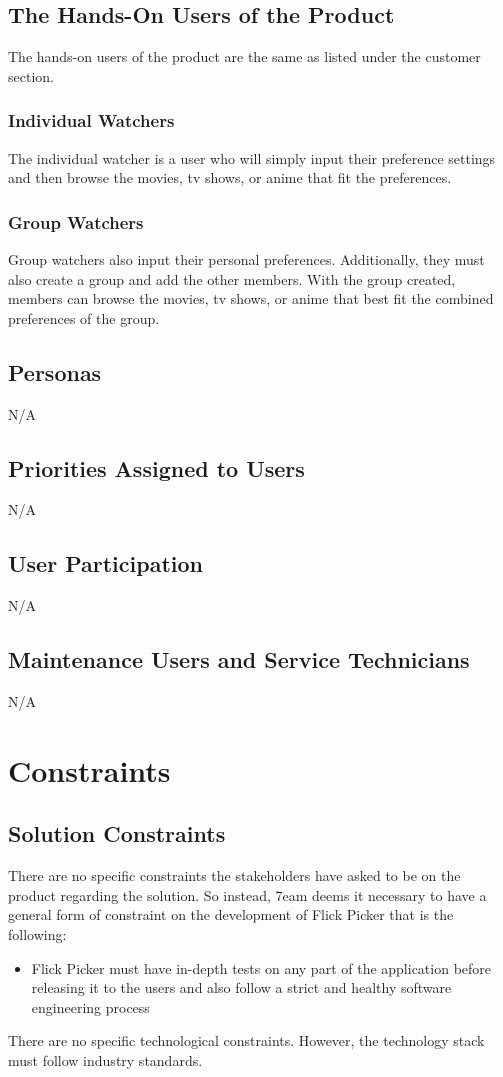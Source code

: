 \documentclass[12pt]{article}
\begin{document}
\subsection{The Hands-On Users of the Product}
The hands-on users of the product are the same as listed under the customer section.

\subsubsection*{Individual Watchers}
The individual watcher is a user who will simply input their preference settings and then browse the movies, tv shows, or anime that fit the preferences.
\subsubsection*{Group Watchers}
Group watchers also input their personal preferences.
Additionally, they must also create a group and add the other members.
With the group created, members can browse the movies, tv shows, or anime that best fit the combined preferences of the group.

\subsection{Personas}
N/A

\subsection{Priorities Assigned to Users}
N/A

\subsection{User Participation}
N/A

\subsection{Maintenance Users and Service Technicians}
N/A

\section{Constraints}

\subsection{Solution Constraints}
There are no specific constraints the stakeholders have asked to be on the product regarding the solution. So instead, 7eam deems it necessary to have a general form of constraint on the development of Flick Picker that is the following:
\begin{itemize}
	\item Flick Picker must have in-depth tests on any part of the application before releasing it to the users and also follow a strict and healthy software engineering process
\end{itemize}
There are no specific technological constraints. However, the technology stack must follow industry standards.
\end{document}
